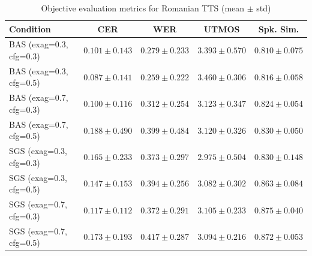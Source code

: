 \begin{table}[htbp]
\centering
\caption{Objective evaluation metrics for Romanian TTS (mean $\pm$ std)}
\label{tab:metrics}
\begin{tabular}{lcccc}
\toprule
Condition & CER & WER & UTMOS & Spk. Sim. \\
\midrule
BAS (exag=0.3, cfg=0.3) & $0.101 \pm 0.143$ & $0.279 \pm 0.233$ & $3.393 \pm 0.570$ & $0.810 \pm 0.075$ \\
BAS (exag=0.3, cfg=0.5) & $0.087 \pm 0.141$ & $0.259 \pm 0.222$ & $3.460 \pm 0.306$ & $0.816 \pm 0.058$ \\
BAS (exag=0.7, cfg=0.3) & $0.100 \pm 0.116$ & $0.312 \pm 0.254$ & $3.123 \pm 0.347$ & $0.824 \pm 0.054$ \\
BAS (exag=0.7, cfg=0.5) & $0.188 \pm 0.490$ & $0.399 \pm 0.484$ & $3.120 \pm 0.326$ & $0.830 \pm 0.050$ \\
SGS (exag=0.3, cfg=0.3) & $0.165 \pm 0.233$ & $0.373 \pm 0.297$ & $2.975 \pm 0.504$ & $0.830 \pm 0.148$ \\
SGS (exag=0.3, cfg=0.5) & $0.147 \pm 0.153$ & $0.394 \pm 0.256$ & $3.082 \pm 0.302$ & $0.863 \pm 0.084$ \\
SGS (exag=0.7, cfg=0.3) & $0.117 \pm 0.112$ & $0.372 \pm 0.291$ & $3.105 \pm 0.233$ & $0.875 \pm 0.040$ \\
SGS (exag=0.7, cfg=0.5) & $0.173 \pm 0.193$ & $0.417 \pm 0.287$ & $3.094 \pm 0.216$ & $0.872 \pm 0.053$ \\
\bottomrule
\end{tabular}
\end{table}
